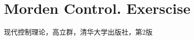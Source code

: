 \chapter{Morden Control. Exerscise}

现代控制理论，高立群，清华大学出版社，第2版 
\vspace{2em}

\begin{question}[p60,2.1]
\end{question}
